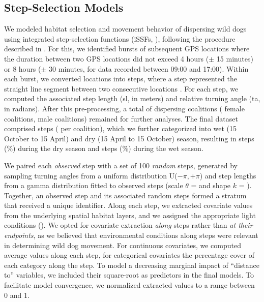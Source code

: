 \documentclass[abstract=on,10pt,a4paper,bibliography=totocnumbered]{article}
\newcommand{\inputy}[1]{\unskip}
\begin{document}
\subsection{Step-Selection Models}

We modeled habitat selection and movement behavior of dispersing wild dogs using
integrated step-selection functions (iSSFs, \citealp{Fortin.2005, Avgar.2016}),
following the procedure described in \citet{Muff.2020}. For this, we identified
bursts of subsequent GPS locations where the duration between two GPS locations
did not exceed 4 hours (\(\pm\) 15 minutes) or 8 hours (\(\pm\) 30 minutes, for
data recorded between 09:00 and 17:00). Within each burst, we converted
locations into steps, where a step represented the straight line segment between
two consecutive locations \citep{Turchin.1998}. For each step, we computed the
associated step length (sl, in meters) and relative turning angle (ta, in
radians). After this pre-processing, a total of \inputy{GeneralMetrics/SSFTotal}
dispersing coalitions (\inputy{GeneralMetrics/SSFFemales} female coalitions,
\inputy{GeneralMetrics/SSFMales} male coalitions) remained for further analyses.
The final dataset comprised \inputy{GeneralMetrics/StepsTotal} steps
(\inputy{GeneralMetrics/StepsMeanSD} per coalition), which we further
categorized into wet (15 October to 15 April) and dry (15 April to 15 October)
season, resulting in \inputy{GeneralMetrics/NumberStepsDry} steps
(\inputy{GeneralMetrics/PercentageStepsDry}\%) during the dry season and
\inputy{GeneralMetrics/NumberStepsWet} steps
(\inputy{GeneralMetrics/PercentageStepsWet}\%) during the wet season.

We paired each \textit{observed} step with a set of 100 \textit{random} steps,
generated by sampling turning angles from  a uniform distribution U(\(-\pi,
+\pi\)) and step lengths from a gamma distribution fitted to observed steps
(scale \(\theta\) = \inputy{GeneralMetrics/GammaScale} and shape \(k\) =
\inputy{GeneralMetrics/GammaShape}). Together, an observed step and its
associated random steps formed a stratum that received a unique identifier.
Along each step, we extracted covariate values from the underlying spatial
habitat layers, and we assigned the appropriate light conditions
(). We opted for covariate extraction \textit{along} steps
rather than \textit{at their endpoints}, as we believed that environmental
conditions along steps were relevant in determining wild dog movement. For
continuous covariates, we computed average values along each step, for
categorical covariates the percentage cover of each category along the step. To
model a decreasing marginal impact of ``distance to'' variables, we included
their square-root as predictors in the final models. To facilitate model
convergence, we normalized extracted values to a range between 0 and 1.
\end{document}
